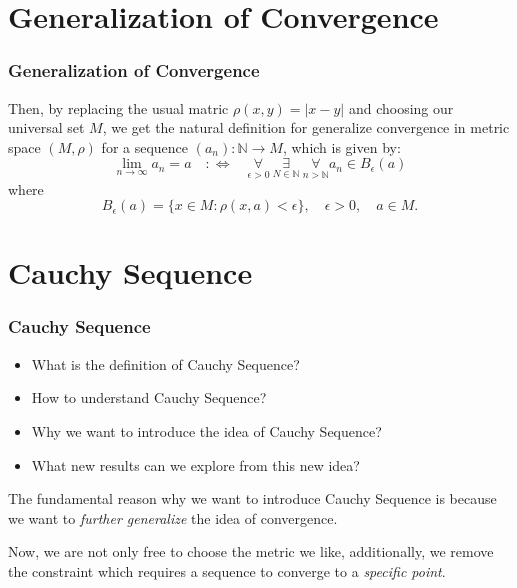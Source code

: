 \documentclass[12pt, t]{beamer}
\renewcommand{\emph}[1]{{\color{Turquoise3}\textsl{#1}}}
\begin{document}
\section{Generalization of Convergence}
\begin{frame}
    \frametitle{Generalization of Convergence}
Then, by replacing the usual matric $\rho(x,y)=|x-y|$ and choosing our universal set $M$, we get the natural definition for
generalize convergence in metric space $(M,\rho)$ for a sequence $(a_n):\mathbb{N}\rightarrow M$, which is given by:
\begin{equation*}
    \lim_{n\rightarrow \infty}a_n=a\quad :\Leftrightarrow \quad \underset{\epsilon>0}{\forall}\ \underset{N\in \mathbb{N}}{\exists}\ \underset{n>\mathbb{N}}{\forall} a_n\in B_\epsilon(a)
\end{equation*}
where
\begin{equation*}
    B_\epsilon(a)=\{ x\in M:\rho(x,a)<\epsilon\},\quad \epsilon>0,\quad a\in M.
\end{equation*}

\end{frame}

\section{Cauchy Sequence}
\begin{frame}
    \frametitle{Cauchy Sequence}
\begin{itemize}
    \item What is the definition of Cauchy Sequence?
    \item How to understand Cauchy Sequence?
    \item Why we want to introduce the idea of Cauchy Sequence?
    \item What new results can we explore from this new idea?
\end{itemize}

\vspace{1em}

The fundamental reason why we want to introduce Cauchy Sequence is because we want to \emph{further generalize} the idea of 
convergence.\\

\vspace{1em}

Now, we are not only free to choose the metric we like, additionally, we remove the constraint which requires a sequence to converge to a \emph{specific point}.
\end{frame}
\end{document}
